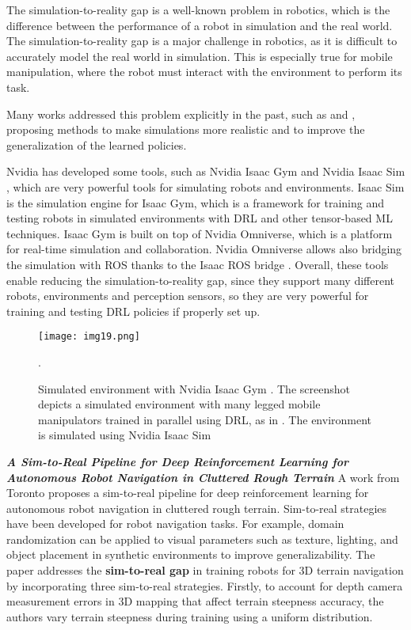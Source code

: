 The simulation-to-reality gap is a well-known problem in robotics, which is the difference
between the performance of a robot in simulation and the real world. The simulation-to-reality
gap is a major challenge in robotics, as it is difficult to accurately model the real world
in simulation. This is especially true for mobile manipulation, where the robot must interact
with the environment to perform its task.

Many works addressed this problem explicitly in the past, such as \cite{liu2021deep} and
\cite{zhang2021simtoreal}, proposing methods to make simulations more realistic and
to improve the generalization of the learned policies.

Nvidia has developed some tools, such as Nvidia Isaac Gym \cite{isaacgym} and Nvidia Isaac Sim
\cite{isaacsim}, which are very powerful tools for simulating robots and environments.
Isaac Sim is the simulation engine for Isaac Gym, which is a framework for training and
testing robots in simulated environments with DRL and other tensor-based ML techniques.
Isaac Gym is built on top of Nvidia Omniverse, which is a platform for real-time
simulation and collaboration. Nvidia Omniverse allows also bridging the simulation with ROS
thanks to the Isaac ROS bridge \cite{isaacros}. Overall, these tools enable reducing the
simulation-to-reality gap, since they support many different robots, environments and perception
sensors, so they are very powerful for training and testing DRL policies if properly set up.

\begin{figure}[t]
	\centering
	\texttt{[image: img19.png]}
	\captionsetup{width=1\linewidth}
	\caption{Simulated environment with Nvidia Isaac Gym \cite{isaacros}.
		The screenshot depicts a simulated environment with many legged mobile manipulators trained in
		parallel using DRL, as in \cite{mittal2022articulated}.
		The environment is simulated using Nvidia Isaac Sim \cite{isaacsim}}.
	\label{fig:img19}
\end{figure}


\textbf{\textit{A Sim-to-Real Pipeline for Deep Reinforcement
		Learning for Autonomous Robot Navigation in
		Cluttered Rough Terrain}} \quad
A work from Toronto \cite{zhang2021simtoreal} proposes a sim-to-real pipeline for
deep reinforcement learning for autonomous robot navigation in cluttered rough terrain.
Sim-to-real strategies have been developed for robot navigation tasks. For example,
domain randomization can be applied to visual parameters such as texture,
lighting, and object placement in synthetic environments to improve generalizability.
The paper \cite{zhang2021simtoreal} addresses the \textbf{sim-to-real gap} in training robots for
3D terrain navigation by incorporating three sim-to-real strategies. Firstly, to account
for depth camera measurement errors in 3D mapping that affect terrain steepness accuracy,
the authors vary terrain steepness during training using a uniform distribution.

